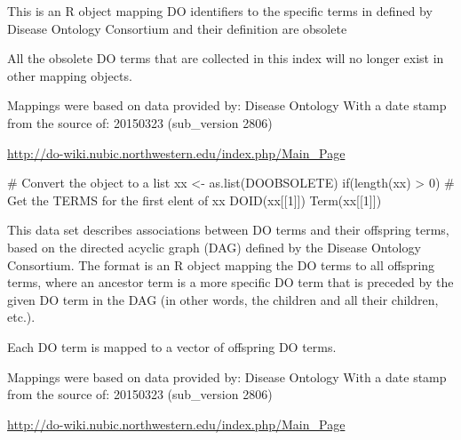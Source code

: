 \documentclass[a4paper]{book}
\begin{document}
%
\begin{Description}\relax
This is an R object mapping DO identifiers to the specific
terms in defined by Disease Ontology Consortium and their definition are obsolete
\end{Description}
%
\begin{Details}\relax
All the obsolete DO terms that are collected in this index will no longer exist 
in other mapping objects.

Mappings were based on data provided by: Disease Ontology
With a date stamp from the source of: 20150323 (sub\_version 2806)


\end{Details}
%
\begin{References}\relax
\url{http://do-wiki.nubic.northwestern.edu/index.php/Main_Page} 

\end{References}
%
\begin{Examples}
\begin{ExampleCode}
    # Convert the object to a list
    xx <- as.list(DOOBSOLETE)
    if(length(xx) > 0){
        # Get the TERMS for the first elent of xx
        DOID(xx[[1]])
        Term(xx[[1]])
    }
\end{ExampleCode}
\end{Examples}
%
\begin{Description}\relax
This data set describes associations between DO 
terms and their offspring  terms, based on the directed acyclic
graph (DAG) defined by the Disease Ontology Consortium. The format is an R
object mapping the DO  terms to all offspring terms, where an
ancestor term is a more specific DO term that is preceded
by the given DO term in the DAG (in other words, the children and all
their children, etc.).
\end{Description}
%
\begin{Details}\relax
Each DO  term is mapped to a vector of offspring DO  terms.


Mappings were based on data provided by: Disease Ontology
With a date stamp from the source of: 20150323 (sub\_version 2806)


\end{Details}
%
\begin{References}\relax
\url{http://do-wiki.nubic.northwestern.edu/index.php/Main_Page} 

\end{References}
\end{document}
